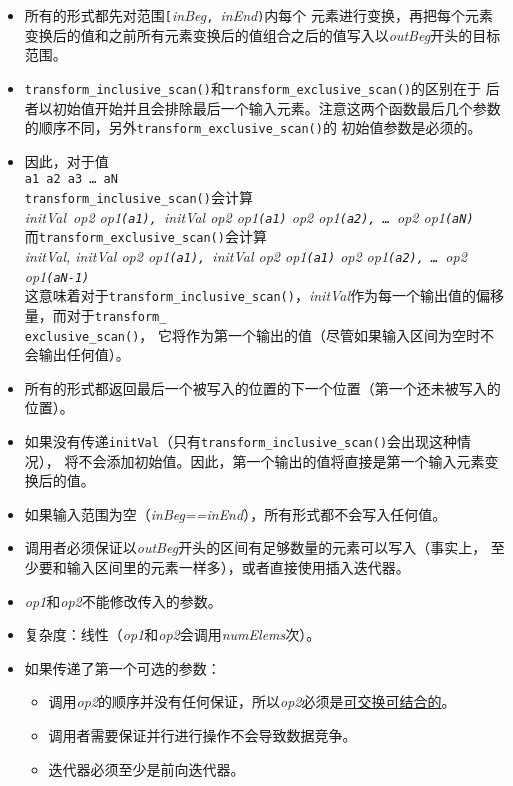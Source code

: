 \begin{itemize}
    \item 所有的形式都先对范围\texttt{[}\emph{inBeg}\texttt{, }\emph{inEnd}\texttt{)}内每个
    元素进行变换，再把每个元素变换后的值和之前所有元素变换后的值组合之后的值写入以\emph{outBeg}开头的目标范围。
    \item \texttt{transform\_inclusive\_scan()}和\texttt{transform\_exclusive\_scan()}的区别在于
    后者以初始值开始并且会排除最后一个输入元素。注意这两个函数最后几个参数的顺序不同，另外\texttt{transform\_exclusive\_scan()}的
    初始值参数是必须的。
    \item 因此，对于值\\
    \hspace*{2em}\texttt{a1 a2 a3 \ldots\ aN}\\
    \texttt{transform\_inclusive\_scan()}会计算\\
    \hspace*{2em}\emph{initVal\ op2  op1\texttt{(a1), }initVal op2 op1\texttt{(a1)} op2 op1\texttt{(a2), \ldots\ }op2 op1\texttt{(aN)}}\\
    而\texttt{transform\_exclusive\_scan()}会计算\\
    \hspace*{2em}\emph{initVal, initVal op2 op1\texttt{(a1), }initVal op2 op1\texttt{(a1)} op2 op1\texttt{(a2), \ldots\ }op2 op1\texttt{(aN-1)}}\\
    这意味着对于\texttt{transform\_inclusive\_scan()}，\emph{initVal}作为每一个输出值的偏移量，而对于\texttt{transform\_\\
    exclusive\_scan()}，
    它将作为第一个输出的值（尽管如果输入区间为空时不会输出任何值）。
    \item 所有的形式都返回最后一个被写入的位置的下一个位置（第一个还未被写入的位置）。
    \item 如果没有传递\texttt{initVal}（只有\texttt{transform\_inclusive\_scan()}会出现这种情况），
    将不会添加初始值。因此，第一个输出的值将直接是第一个输入元素变换后的值。
    \item 如果输入范围为空（\emph{inBeg==inEnd}），所有形式都不会写入任何值。
    \item 调用者必须保证以\emph{outBeg}开头的区间有足够数量的元素可以写入（事实上，
    至少要和输入区间里的元素一样多），或者直接使用插入迭代器。
    \item \emph{op1}和\emph{op2}不能修改传入的参数。
    \item 复杂度：线性（\emph{op1}和\emph{op2}会调用\emph{numElems}次）。
    \item 如果传递了第一个可选的参数：
    \begin{itemize}
        \item 调用\emph{op2}的顺序并没有任何保证，所以\emph{op2}必须是\hyperref[ch22.6.1.1]{可交换可结合的}。
        \item 调用者需要保证并行进行操作不会导致数据竞争。
        \item 迭代器必须至少是前向迭代器。
    \end{itemize}
\end{itemize}
